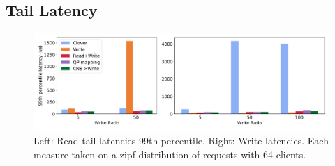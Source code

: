 
\subsection{Tail Latency}

\begin{figure}
    \includegraphics[width=1.0\textwidth]{fig/99th_latency.pdf}
    \caption{Left: Read tail latencies 99th percentile. Right: Write latencies. Each measure taken on a zipf distribution of requests with 64 clients.}
    \label{fig:tail_latency}
\end{figure}

